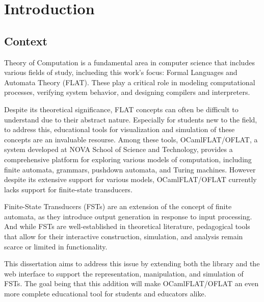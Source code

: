 
%

\chapter{Introduction}
\label{cha:introduction}

\section{Context}

Theory of Computation is a fundamental area in computer science that includes various
fields of study, inclueding this work's focus: Formal Languages and Automata
Theory (FLAT). These play a critical role in modeling computational processes, verifying system behavior, 
and designing compilers and interpreters. 

Despite its theoretical significance, FLAT concepts can often be difficult to understand due to their abstract nature. 
Especially for students new to the field, to address this, educational
tools for visualization and simulation of these concepts are an invaluable resourse. 
Among these tools, OCamlFLAT/OFLAT, a system developed at NOVA School of Science and Technology,
provides a comprehensive platform for exploring various models of computation, including finite automata, grammars, pushdown automata, and Turing machines.
However despite its extensive support for various models, OCamlFLAT/OFLAT currently lacks support for finite-state transducers. 

Finite-State Transducers (FSTs) are an extension of the concept of finite automata, 
as they introduce output generation in response to input processing.
And while FSTs are well-established in theoretical literature, pedagogical tools 
that allow for their interactive construction, simulation, and analysis remain scarce or limited in functionality.

This dissertation aims to address this issue by extending both the library and the web interface to support the representation, manipulation, and simulation of FSTs. 
The goal being that this addition will make OCamlFLAT/OFLAT an even more complete educational tool for students and educators alike.


